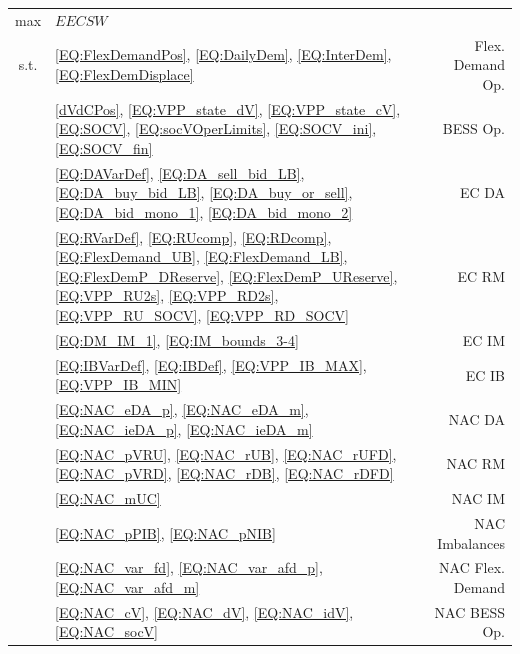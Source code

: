 {\small
\begin{tabularx}{\textwidth}{c >{\raggedright\arraybackslash}X r}

max & $EECSW$ & \\[0.5em]

s.t. & \eqref{EQ:FlexDemandPos}, \eqref{EQ:DailyDem}, \eqref{EQ:InterDem}, \eqref{EQ:FlexDemDisplace} & Flex. Demand Op. \\[0.2em]

& \eqref{dVdCPos}, \eqref{EQ:VPP_state_dV}, \eqref{EQ:VPP_state_cV}, \eqref{EQ:SOCV}, \eqref{EQ:socVOperLimits}, \eqref{EQ:SOCV_ini}, \eqref{EQ:SOCV_fin} & BESS Op. \\[0.2em]

& \eqref{EQ:DAVarDef}, \eqref{EQ:DA_sell_bid_LB}, \eqref{EQ:DA_buy_bid_LB}, \eqref{EQ:DA_buy_or_sell}, \eqref{EQ:DA_bid_mono_1}, \eqref{EQ:DA_bid_mono_2} & EC DA \\[0.2em]

& \eqref{EQ:RVarDef}, \eqref{EQ:RUcomp}, \eqref{EQ:RDcomp}, \eqref{EQ:FlexDemand_UB}, \eqref{EQ:FlexDemand_LB}, \eqref{EQ:FlexDemP_DReserve}, \eqref{EQ:FlexDemP_UReserve}, \eqref{EQ:VPP_RU2s}, \eqref{EQ:VPP_RD2s}, \eqref{EQ:VPP_RU_SOCV}, \eqref{EQ:VPP_RD_SOCV} & EC RM \\[0.2em]

& \eqref{EQ:DM_IM_1}, \eqref{EQ:IM_bounds_3-4} & EC IM \\[0.2em]

& \eqref{EQ:IBVarDef}, \eqref{EQ:IBDef}, \eqref{EQ:VPP_IB_MAX}, \eqref{EQ:VPP_IB_MIN} & EC IB \\[0.2em]

& \eqref{EQ:NAC_eDA_p}, \eqref{EQ:NAC_eDA_m}, \eqref{EQ:NAC_ieDA_p}, \eqref{EQ:NAC_ieDA_m} & NAC DA \\[0.2em]

& \eqref{EQ:NAC_pVRU}, \eqref{EQ:NAC_rUB}, \eqref{EQ:NAC_rUFD}, \eqref{EQ:NAC_pVRD}, \eqref{EQ:NAC_rDB}, \eqref{EQ:NAC_rDFD} & NAC RM \\[0.2em]

& \eqref{EQ:NAC_mUC} & NAC IM \\[0.2em]

& \eqref{EQ:NAC_pPIB}, \eqref{EQ:NAC_pNIB} & NAC Imbalances \\[0.2em]

& \eqref{EQ:NAC_var_fd}, \eqref{EQ:NAC_var_afd_p}, \eqref{EQ:NAC_var_afd_m} & NAC Flex. Demand \\[0.2em]

& \eqref{EQ:NAC_cV}, \eqref{EQ:NAC_dV}, \eqref{EQ:NAC_idV}, \eqref{EQ:NAC_socV} & NAC BESS Op. \\

\end{tabularx}
}

